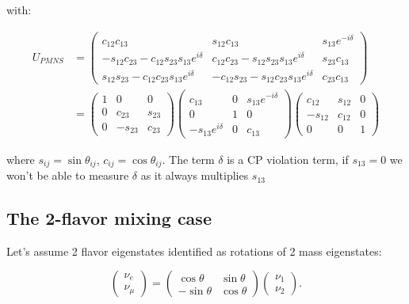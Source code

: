 \documentclass[
  letterpaper,
  DIV=11,
  numbers=noendperiod]{scrreprt}
\begin{document}
with:

\[
\begin{aligned}
U_{PMNS} &= 
\begin{pmatrix} 
c_{12}c_{13} & s_{12}c_{13} & s_{13}e^{-i\delta} \\
-s_{12}c_{23} - c_{12}s_{23}s_{13}e^{i\delta} & c_{12}c_{23} - s_{12}s_{23}s_{13}e^{i\delta} & s_{23}c_{13} \\
s_{12}s_{23} - c_{12}c_{23}s_{13}e^{i\delta} & -c_{12}s_{23} - s_{12}c_{23}s_{13}e^{i\delta} & c_{23}c_{13} \end{pmatrix} \\
&= \begin{pmatrix} 
1 & 0 & 0 \\ 0 & c_{23} & s_{23} \\ 0 & -s_{23} & c_{23} 
\end{pmatrix}
\begin{pmatrix} 
c_{13} & 0 & s_{13}e^{-i\delta} \\ 0 & 1 & 0 \\ -s_{13}e^{i\delta} & 0 & c_{13} 
\end{pmatrix}
\begin{pmatrix} 
c_{12} & s_{12} & 0 \\ -s_{12} & c_{12} & 0 \\ 0 & 0 & 1 
\end{pmatrix}
\end{aligned}
\]

where \(s_{ij} = \sin \theta_{ij}\), \(c_{ij} = \cos \theta_{ij}\). The
term \(\delta\) is a CP violation term, if \(s_{13} = 0\) we won't be
able to measure \(\delta\) as it always multiplies \(s_{13}\)

\subsection{The 2-flavor mixing case}\label{the-2-flavor-mixing-case}

Let's assume 2 flavor eigenstates identified as rotations of 2 mass
eigenstates:

\[\begin{pmatrix} \nu_e \\ \nu_\mu \end{pmatrix} = \begin{pmatrix} \cos\theta & \sin\theta \\ -\sin\theta & \cos\theta \end{pmatrix} \begin{pmatrix} \nu_1 \\ \nu_2 \end{pmatrix}.\]
\end{document}
